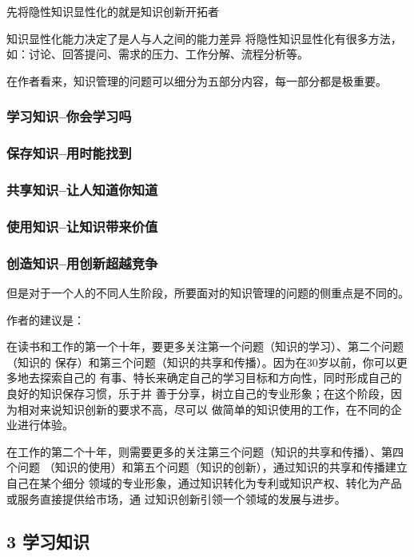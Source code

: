 \documentclass[11pt]{ctexart}
\begin{document}
{{{{先将隐性知识显性化的就是知识创新开拓者

知识显性化能力决定了是人与人之间的能力差异
将隐性知识显性化有很多方法，如：讨论、回答提问、需求的压力、工作分解、流程分析等。

在作者看来，知识管理的问题可以细分为五部分内容，每一部分都是极重要。

\subsubsection{学习知识--你会学习吗}
\label{sec:orge5e4166}

\subsubsection{保存知识--用时能找到}
\label{sec:org1f9d507}

\subsubsection{共享知识--让人知道你知道}
\label{sec:org353f4e1}

\subsubsection{使用知识--让知识带来价值}
\label{sec:org8cc8fbb}

\subsubsection{创造知识--用创新超越竞争}
\label{sec:orgd34afff}
但是对于一个人的不同人生阶段，所要面对的知识管理的问题的侧重点是不同的。

作者的建议是：

在读书和工作的第一个十年，要更多关注第一个问题（知识的学习）、第二个问题（知识的
保存）和第三个问题（知识的共享和传播）。因为在30岁以前，你可以更多地去探索自己的
有事、特长来确定自己的学习目标和方向性，同时形成自己的良好的知识保存习惯，乐于并
善于分享，树立自己的专业形象；在这个阶段，因为相对来说知识创新的要求不高，尽可以
做简单的知识使用的工作，在不同的企业进行体验。

在工作的第二个十年，则需要更多的关注第三个问题（知识的共享和传播）、第四个问题
（知识的使用）和第五个问题（知识的创新），通过知识的共享和传播建立自己在某个细分
领域的专业形象，通过知识转化为专利或知识产权、转化为产品或服务直接提供给市场，通
过知识创新引领一个领域的发展与进步。

\subsection{3 学习知识}
\label{sec:org782f3f5}

}}}}
\end{document}
